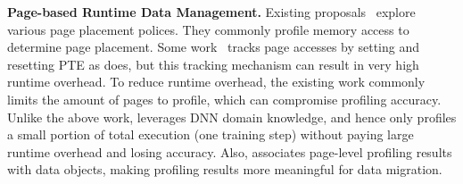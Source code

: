 \begin{comment}
\textcolor{jie}{\textbf{Data Management for Managed Runtime.}
Existing efforts~\cite{pldi19:panthera, pldi18:KG,ASPLOS18:Espresso,sigmetrics19:crystalgazer} that leverage managed runtime such as JVM for data management on HM. 
Write Rationing~\cite{pldi18:KG} and Crystal Gazer~\cite{sigmetrics19:crystalgazer} aims to prolong NVM lifetime by placing frequently written objects in DRAM and read-mostly objects in NVM. Write Rationing needs continuously monitor object write behavior and incurs non-negligible execution time overhead. Crystal Gazer uses offline profiling to reduce the runtime overhead. Different from those works, \name profiles data objects access for both read and write operation online with negligible overhead.
The recent work Panthera~\cite{pldi19:panthera} close \name, which optimizes data layout in HM for Big Data workload for better performance on HM. Panthera uses static analysis plus dynamic monitoring for data migration decisions, which is reactive. Instead, \name leverage migration interval to proactively migrate data into DRAM before data access happens.}

\textcolor{jie}{
There are several major differences between \name and managed runtime data management.
First, \name focuses on the DNN model training workload. Current DNN model training frameworks are not using managed runtime. 
Second, the existing works on data management based on JVM migrate data objects during the GC process, while Sentinel triggers data objects migration according to the DNN model structure, which makes migration more flexible. Third, the GC process will "stop-the-world" while \name migrates data objects asynchronously, which does not incur large runtime overhead.
}
\end{comment}




\textbf{Page-based Runtime Data Management.}
Existing proposals~\cite{Thermostat:asplos17,RAMinate:socc16,heteros:isca17,unimem:sc17,sc18:wu,Yan:ASPLOS19} explore various page placement polices. They commonly profile memory access to determine page placement. Some work~\cite{Thermostat:asplos17,RAMinate:socc16,heteros:isca17} tracks page accesses by setting and resetting PTE as \name does, but this tracking mechanism can result in very high runtime overhead. To reduce runtime overhead, the existing work commonly limits the amount of pages to profile, which can compromise profiling accuracy. Unlike the above work, \name leverages DNN domain knowledge, and hence only profiles a small portion of total execution (one training step) without paying large runtime overhead and losing accuracy. Also, \name associates page-level profiling results with data objects, making profiling results more meaningful for data migration.


